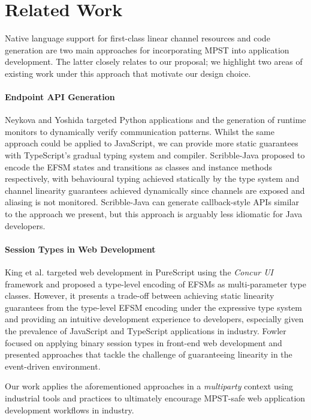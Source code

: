\section{Related Work}
Native language support for first-class linear channel resources \cite{ATS} and
code generation are two main approaches for incorporating MPST into application
development.
The latter closely relates to our proposal;
we highlight two areas of existing work under this approach that motivate our
design choice.

\paragraph{Endpoint API Generation}
Neykova and Yoshida targeted Python applications and the generation of runtime
monitors \cite{Python2017} to dynamically verify communication patterns.
Whilst the same approach could be applied to JavaScript, we can provide more
static guarantees with TypeScript's gradual typing system and compiler. Scribble-Java \cite{Hybrid2016} proposed to encode the EFSM
states and transitions as classes and instance methods respectively, with
behavioural typing achieved statically by the type system and channel linearity
guarantees achieved dynamically since channels are exposed and
aliasing is not monitored.
Scribble-Java can generate callback-style APIs similar to the approach we 
present, but this approach is arguably less idiomatic for Java developers.

\paragraph{Session Types in Web Development}
King et al. \cite{PureScript2019} targeted web development in PureScript using the
\textit{Concur UI} framework and proposed a type-level encoding of EFSMs as
multi-parameter type classes.
However, it presents a trade-off between achieving static linearity guarantees
from the type-level EFSM encoding under the expressive type system and
providing an intuitive development experience to developers, especially given
the prevalence of JavaScript and TypeScript applications in industry. Fowler \cite{MVU2019} focused on applying binary session types in front-end web
development and presented approaches that tackle the challenge of guaranteeing
linearity in the event-driven environment.

Our work applies the aforementioned approaches in a \textit{multiparty} context
using industrial tools and practices to ultimately encourage MPST-safe web
application development workflows in industry.


